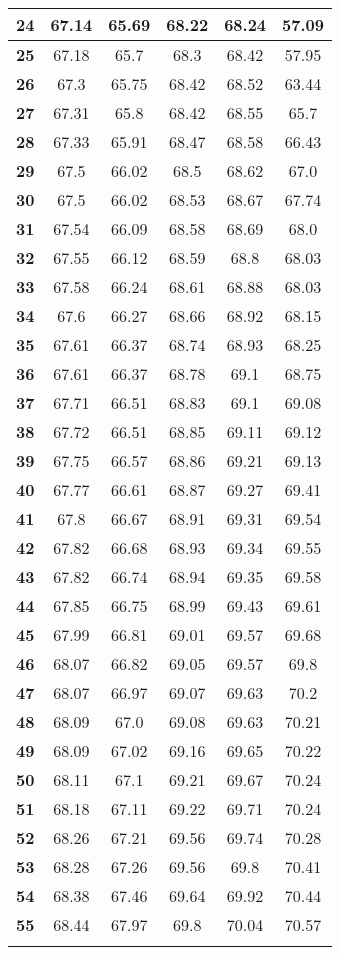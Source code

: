\begin{longtable}{|c|c|c|c|c|c|}
\textbf{24} & 67.14 & 65.69 & 68.22 & 68.24 & 57.09 \\ \hline 
\textbf{25} & 67.18 & 65.7 & 68.3 & 68.42 & 57.95 \\ \hline 
\textbf{26} & 67.3 & 65.75 & 68.42 & 68.52 & 63.44 \\ \hline 
\textbf{27} & 67.31 & 65.8 & 68.42 & 68.55 & 65.7 \\ \hline 
\textbf{28} & 67.33 & 65.91 & 68.47 & 68.58 & 66.43 \\ \hline 
\textbf{29} & 67.5 & 66.02 & 68.5 & 68.62 & 67.0 \\ \hline 
\textbf{30} & 67.5 & 66.02 & 68.53 & 68.67 & 67.74 \\ \hline 
\textbf{31} & 67.54 & 66.09 & 68.58 & 68.69 & 68.0 \\ \hline 
\textbf{32} & 67.55 & 66.12 & 68.59 & 68.8 & 68.03 \\ \hline 
\textbf{33} & 67.58 & 66.24 & 68.61 & 68.88 & 68.03 \\ \hline 
\textbf{34} & 67.6 & 66.27 & 68.66 & 68.92 & 68.15 \\ \hline 
\textbf{35} & 67.61 & 66.37 & 68.74 & 68.93 & 68.25 \\ \hline 
\textbf{36} & 67.61 & 66.37 & 68.78 & 69.1 & 68.75 \\ \hline 
\textbf{37} & 67.71 & 66.51 & 68.83 & 69.1 & 69.08 \\ \hline 
\textbf{38} & 67.72 & 66.51 & 68.85 & 69.11 & 69.12 \\ \hline 
\textbf{39} & 67.75 & 66.57 & 68.86 & 69.21 & 69.13 \\ \hline 
\textbf{40} & 67.77 & 66.61 & 68.87 & 69.27 & 69.41 \\ \hline 
\textbf{41} & 67.8 & 66.67 & 68.91 & 69.31 & 69.54 \\ \hline 
\textbf{42} & 67.82 & 66.68 & 68.93 & 69.34 & 69.55 \\ \hline 
\textbf{43} & 67.82 & 66.74 & 68.94 & 69.35 & 69.58 \\ \hline 
\textbf{44} & 67.85 & 66.75 & 68.99 & 69.43 & 69.61 \\ \hline 
\textbf{45} & 67.99 & 66.81 & 69.01 & 69.57 & 69.68 \\ \hline 
\textbf{46} & 68.07 & 66.82 & 69.05 & 69.57 & 69.8 \\ \hline 
\textbf{47} & 68.07 & 66.97 & 69.07 & 69.63 & 70.2 \\ \hline 
\textbf{48} & 68.09 & 67.0 & 69.08 & 69.63 & 70.21 \\ \hline 
\textbf{49} & 68.09 & 67.02 & 69.16 & 69.65 & 70.22 \\ \hline 
\textbf{50} & 68.11 & 67.1 & 69.21 & 69.67 & 70.24 \\ \hline 
\textbf{51} & 68.18 & 67.11 & 69.22 & 69.71 & 70.24 \\ \hline 
\textbf{52} & 68.26 & 67.21 & 69.56 & 69.74 & 70.28 \\ \hline 
\textbf{53} & 68.28 & 67.26 & 69.56 & 69.8 & 70.41 \\ \hline 
\textbf{54} & 68.38 & 67.46 & 69.64 & 69.92 & 70.44 \\ \hline 
\textbf{55} & 68.44 & 67.97 & 69.8 & 70.04 & 70.57 \\ \hline 

    \caption[]{}
    \label{Tab:}
\end{longtable}